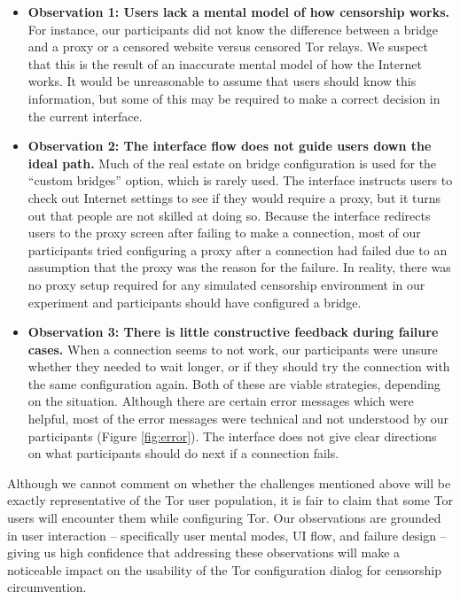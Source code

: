 \documentclass{template}
\begin{document}
\begin{itemize} \itemsep1pt \parskip0pt 
\item {\bfseries Observation 1: Users lack a mental model of how censorship works.} For instance, our participants did not know the difference between a bridge and a proxy or a censored website versus censored Tor relays. We suspect that this is the result of an inaccurate mental model of how the Internet works.  It would be unreasonable to assume that users should know this information, but some of this may be required to make a correct decision in the current interface. 
\item {\bfseries Observation 2: The interface flow does not guide users down the ideal path.} Much of the real estate on bridge configuration is used for the ``custom bridges'' option, which is rarely used. The interface instructs users to check out Internet settings to see if they would require a proxy, but it turns out that people are not skilled at doing so. Because the interface redirects users to the proxy screen after failing to make a connection, most of our participants tried configuring a proxy after a connection had failed due to an assumption that the proxy was the reason for the failure. In reality, there was no proxy setup required for any simulated censorship environment in our experiment and participants should have configured a bridge. 
\item {\bfseries Observation 3: There is little constructive feedback during
    failure cases.} When a connection seems to not work, our participants were
    unsure whether they needed to wait longer, or if they should try the
    connection with the same configuration again. Both of these are viable
    strategies, depending on the situation. Although there are certain error
    messages which were helpful, most of the error messages were technical and
    not understood by our participants (Figure \ref{fig:error}). The interface
    does not give clear directions on what participants should do next if a
    connection fails. 
\end{itemize}

Although we cannot comment on whether the challenges mentioned above will be
exactly representative of the Tor user population, it is fair to claim that some
Tor users will encounter them while configuring Tor. Our observations are
grounded in user interaction -- specifically user mental modes, UI flow, and
failure design -- giving us high confidence that addressing these observations
will make a noticeable impact on the usability of the Tor configuration dialog
for censorship circumvention.
\end{document}
